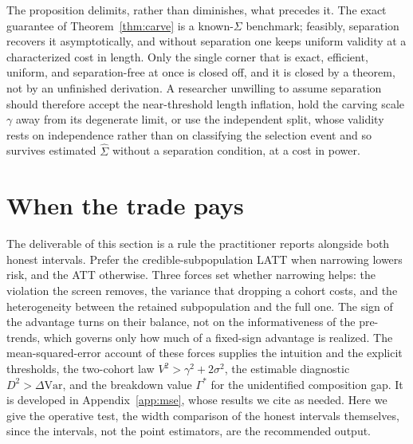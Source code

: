 \documentclass[12pt]{article}
\theoremstyle{remark}
\begin{document}
The proposition delimits, rather than diminishes, what precedes it. The exact guarantee of
Theorem~\ref{thm:carve} is a known-$\Sigma$ benchmark; feasibly, separation recovers it asymptotically, and
without separation one keeps uniform validity at a characterized cost in length. Only the single corner that
is exact, efficient, uniform, and separation-free at once is closed off, and it is closed by a theorem, not
by an unfinished derivation. A researcher unwilling to assume separation should therefore accept the
near-threshold length inflation, hold the carving scale $\gamma$ away from its degenerate limit, or use the
independent split, whose validity rests on independence rather than on classifying the selection event and so
survives estimated $\hat\Sigma$ without a separation condition, at a cost in power.

\section{When the trade pays}\label{sec:dominance}

The deliverable of this section is a rule the practitioner reports alongside both honest intervals. Prefer
the credible-subpopulation LATT when narrowing lowers risk, and the ATT otherwise. Three forces set whether
narrowing helps: the violation the screen removes, the variance that dropping a cohort costs, and the
heterogeneity between the retained subpopulation and the full one. The sign of the advantage turns on their
balance, not on the informativeness of the pre-trends, which governs only how much of a fixed-sign
advantage is realized. The mean-squared-error account of these forces supplies the intuition and the
explicit thresholds, the two-cohort law $V^2>\gamma^2+2\sigma^2$, the estimable diagnostic
$D^2>\Delta\mathrm{Var}$, and the breakdown value $\Gamma^\ast$ for the unidentified composition gap. It is
developed in Appendix~\ref{app:mse}, whose results we cite as needed. Here we give the operative test, the
width comparison of the honest intervals themselves, since the intervals, not the point estimators, are the
recommended output.
\end{document}
